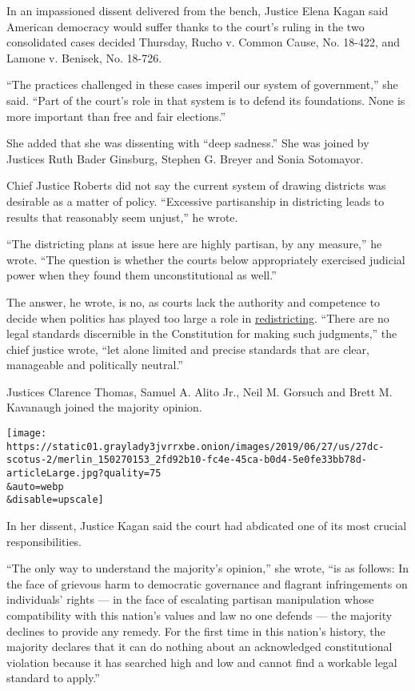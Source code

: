 In an impassioned dissent delivered from the bench, Justice Elena Kagan
said American democracy would suffer thanks to the court's ruling in the
two consolidated cases decided Thursday, Rucho v. Common Cause, No.
18-422, and Lamone v. Benisek, No. 18-726.

``The practices challenged in these cases imperil our system of
government,'' she said. ``Part of the court's role in that system is to
defend its foundations. None is more important than free and fair
elections.''

She added that she was dissenting with ``deep sadness.'' She was joined
by Justices Ruth Bader Ginsburg, Stephen G. Breyer and Sonia Sotomayor.

Chief Justice Roberts did not say the current system of drawing
districts was desirable as a matter of policy. ``Excessive partisanship
in districting leads to results that reasonably seem unjust,'' he wrote.

``The districting plans at issue here are highly partisan, by any
measure,'' he wrote. ``The question is whether the courts below
appropriately exercised judicial power when they found them
unconstitutional as well.''

The answer, he wrote, is no, as courts lack the authority and competence
to decide when politics has played too large a role in
\href{https://www.nytimes3xbfgragh.onion/2020/07/21/us/politics/trump-immigrants-census-redistricting.html}{redistricting}.
``There are no legal standards discernible in the Constitution for
making such judgments,'' the chief justice wrote, ``let alone limited
and precise standards that are clear, manageable and politically
neutral.''

Justices Clarence Thomas, Samuel A. Alito Jr., Neil M. Gorsuch and Brett
M. Kavanaugh joined the majority opinion.

\texttt{[image: https://static01.graylady3jvrrxbe.onion/images/2019/06/27/us/27dc-scotus-2/merlin\_150270153\_2fd92b10-fc4e-45ca-b0d4-5e0fe33bb78d-articleLarge.jpg?quality=75\\\&auto=webp\\\&disable=upscale]}

In her dissent, Justice Kagan said the court had abdicated one of its
most crucial responsibilities.

``The only way to understand the majority's opinion,'' she wrote, ``is
as follows: In the face of grievous harm to democratic governance and
flagrant infringements on individuals' rights --- in the face of
escalating partisan manipulation whose compatibility with this nation's
values and law no one defends --- the majority declines to provide any
remedy. For the first time in this nation's history, the majority
declares that it can do nothing about an acknowledged constitutional
violation because it has searched high and low and cannot find a
workable legal standard to apply.''

